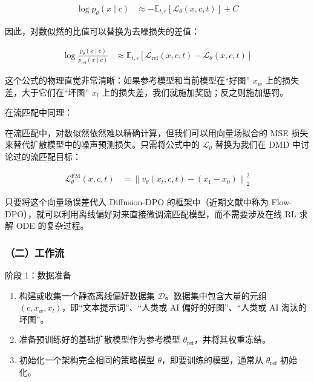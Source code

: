 \[
\begin{aligned}
\log p_\theta(x\mid c)
&\approx -\mathbb{E}_{t,\epsilon}\left[\mathcal{L}_\theta(x,c,t)\right]+C
\end{aligned}
\]

因此，对数似然的比值可以替换为去噪损失的差值：

\[
\begin{aligned}
\log\frac{p_\theta(x\mid c)}{p_{\mathrm{ref}}(x\mid c)}
&\approx
\mathbb{E}_{t,\epsilon}
\left[
\mathcal{L}_{\mathrm{ref}}(x,c,t)-\mathcal{L}_\theta(x,c,t)
\right]
\end{aligned}
\]

这个公式的物理直觉非常清晰：如果参考模型和当前模型在``好图'' \(x_w\) 上的损失差，大于它们在``坏图'' \(x_l\) 上的损失差，我们就施加奖励；反之则施加惩罚。

在流匹配中同理：

在流匹配中，对数似然依然难以精确计算，但我们可以用向量场拟合的 MSE 损失来替代扩散模型中的噪声预测损失。只需将公式中的 \(\mathcal{L}_\theta\) 替换为我们在 DMD 中讨论过的流匹配目标：

\[
\begin{aligned}
\mathcal{L}^{\mathrm{FM}}_\theta(x,c,t)
&=\left\lVert v_\theta(x_t,c,t)-(x_1-x_0)\right\rVert_2^2
\end{aligned}
\]

只要将这个向量场误差代入 Diffusion-DPO 的框架中（近期文献中称为 Flow-DPO），就可以利用离线偏好对来直接微调流匹配模型，而不需要涉及在线 RL 求解 ODE 的复杂过程。

\hypertarget{ux4e8cux5de5ux4f5cux6d41-5}{%
\subsubsection{（二）工作流}\label{ux4e8cux5de5ux4f5cux6d41-5}}

阶段 1：数据准备

\begin{enumerate}
\def\labelenumi{\arabic{enumi}.}
\tightlist
\item
  构建或收集一个静态离线偏好数据集 \(\mathcal{D}\)。数据集中包含大量的元组 \((c,x_w,x_l)\)，即``文本提示词''、``人类或 AI 偏好的好图''、``人类或 AI 淘汰的坏图''。
\item
  准备预训练好的基础扩散模型作为参考模型 \(\theta_{\mathrm{ref}}\)，并将其权重冻结。
\item
  初始化一个架构完全相同的策略模型 \(\theta\)，即要训练的模型，通常从 \(\theta_{\mathrm{ref}}\) 初始化。
\end{enumerate}

